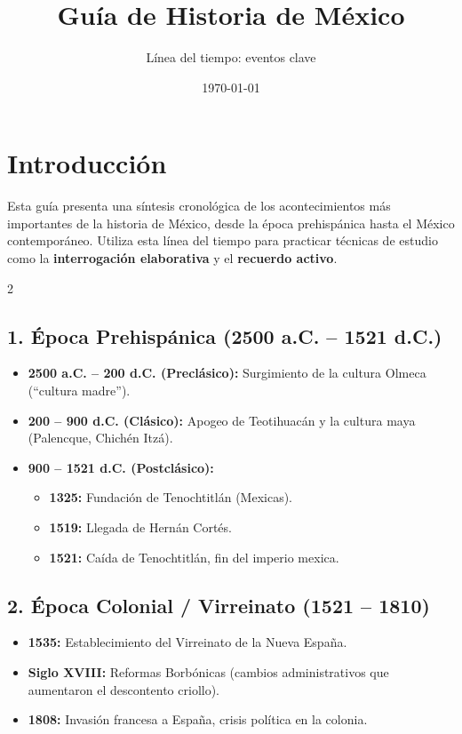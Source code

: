 \documentclass[12pt,a4paper]{article}
\title{\textbf{Guía de Historia de México}}
\author{Línea del tiempo: eventos clave}
\date{\today}
\begin{document}
\maketitle

\section*{Introducción}
Esta guía presenta una síntesis cronológica de los acontecimientos más importantes de la historia de México, desde la época prehispánica hasta el México contemporáneo. Utiliza esta línea del tiempo para practicar técnicas de estudio como la \textbf{interrogación elaborativa} y el \textbf{recuerdo activo}.

\begin{multicols}{2}
\raggedcolumns

\subsection*{1. Época Prehispánica (2500 a.C. – 1521 d.C.)}
\begin{itemize}[label=\textbullet]
    \item \textbf{2500 a.C. – 200 d.C. (Preclásico):} Surgimiento de la cultura Olmeca (“cultura madre”).
    \item \textbf{200 – 900 d.C. (Clásico):} Apogeo de Teotihuacán y la cultura maya (Palencque, Chichén Itzá).
    \item \textbf{900 – 1521 d.C. (Postclásico):} 
    \begin{itemize}
        \item \textbf{1325:} Fundación de Tenochtitlán (Mexicas).
        \item \textbf{1519:} Llegada de Hernán Cortés.
        \item \textbf{1521:} Caída de Tenochtitlán, fin del imperio mexica.
    \end{itemize}
\end{itemize}

\subsection*{2. Época Colonial / Virreinato (1521 – 1810)}
\begin{itemize}[label=\textbullet]
    \item \textbf{1535:} Establecimiento del Virreinato de la Nueva España.
    \item \textbf{Siglo XVIII:} Reformas Borbónicas (cambios administrativos que aumentaron el descontento criollo).
    \item \textbf{1808:} Invasión francesa a España, crisis política en la colonia.
\end{itemize}


\end{multicols}
\end{document}
